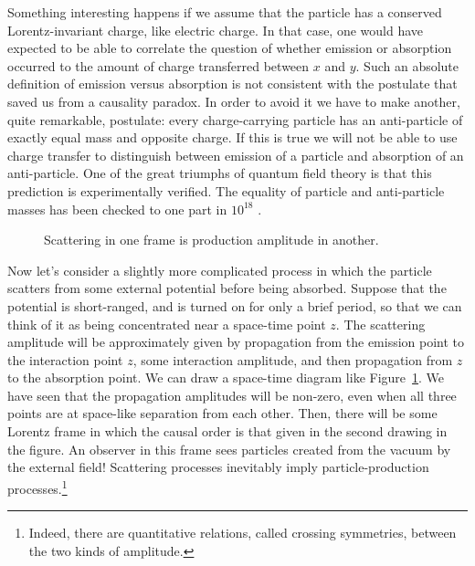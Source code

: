 Something interesting happens if we assume that the particle has a conserved
Lorentz-invariant charge, like electric charge. In that case, one would have expected
to be able to correlate the question of whether emission or absorption occurred to the
amount of charge transferred between $x$ and $y$. Such an absolute definition of emission
versus absorption is not consistent with the postulate that saved us from a causality
paradox. In order to avoid it we have to make another, quite remarkable, postulate:
every charge-carrying particle has an anti-particle of exactly equal mass and opposite
charge. If this is true we will not be able to use charge transfer to distinguish between
emission of a particle and absorption of an anti-particle. One of the great triumphs of
quantum field theory is that this prediction is experimentally verified. The equality of
particle and anti-particle masses has been checked to one part in $10^{18}$ \cite{banks-ref-5}.

\begin{figure}[htbp]
  \centering
  
  \caption{Scattering in one frame is production amplitude in another.}
  \label{fig:1.2}
\end{figure}

Now let's consider a slightly more complicated process in which the particle scatters
from some external potential before being absorbed. Suppose that the potential is
short-ranged, and is turned on for only a brief period, so that we can think of it
as being concentrated near a space-time point $z$. The scattering amplitude will be
approximately given by propagation from the emission point to the interaction point
$z$, some interaction amplitude, and then propagation from $z$ to the absorption point.
We can draw a space-time diagram like Figure~\ref{fig:1.2}. We have seen that the propagation
amplitudes will be non-zero, even when all three points are at space-like separation
from each other. Then, there will be some Lorentz frame in which the causal order is
that given in the second drawing in the figure. An observer in this frame sees particles
created from the vacuum by the external field! Scattering processes inevitably imply
particle-production processes.\footnote[3]{Indeed, there are quantitative relations, called crossing symmetries, between the two kinds of amplitude.}

